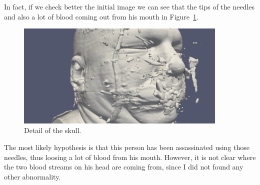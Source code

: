 \documentclass[a4paper]{article}
\begin{document}
In fact, if we check better the initial image we can see that the tips of the needles and also a lot of blood coming out from his mouth in Figure~\ref{img:detail}.

\begin{figure}[htbp]
\centering
\includegraphics[width=0.9\textwidth]{res/detail.png}
\caption{Detail of the skull.}
\label{img:detail}
\end{figure}

The most likely hypothesis is that this person has been assassinated using those needles, thus loosing a lot of blood from his mouth. However, it is not clear where the two blood streams on his head are coming from, since I did not found any other abnormality.
\end{document}
